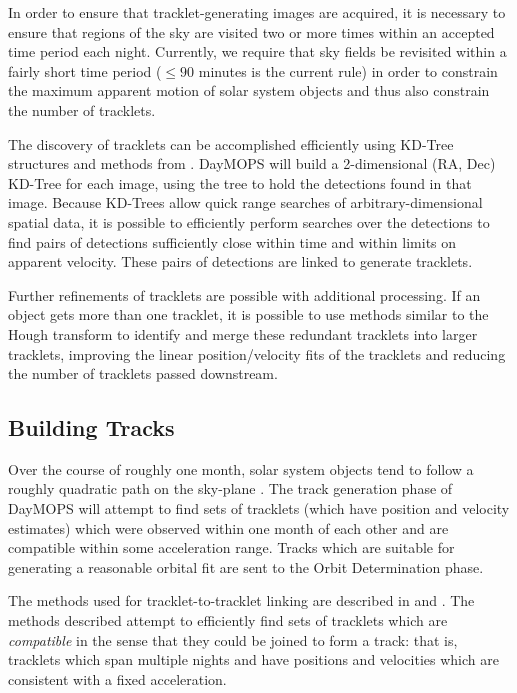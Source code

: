 \documentclass[12pt,preprint]{aastex}
\begin{document}
In order to ensure that tracklet-generating images are acquired, it is
necessary to ensure that regions of the sky are visited two or more
times within an accepted time period each night.  Currently, we
require that sky fields be revisited within a fairly short time period
($\leq 90$ minutes is the current rule) in order to constrain the
maximum apparent motion of solar system objects and thus also
constrain the number of tracklets.

The discovery of tracklets can be accomplished efficiently using
KD-Tree structures \citep{bentley_kdtrees} and methods from
\citet{kubica_thesis}.  DayMOPS will build a 2-dimensional (RA, Dec)
KD-Tree for each image, using the tree to hold the detections found in
that image.  Because KD-Trees allow quick range searches of
arbitrary-dimensional spatial data, it is possible to efficiently
perform searches over the detections to find pairs of detections
sufficiently close within time and within limits on apparent
velocity. These pairs of detections are linked to generate tracklets.


Further refinements of tracklets are possible with additional
processing. If an object gets more than one tracklet, it is possible
to use methods similar to the Hough transform to identify and merge
these redundant tracklets into larger tracklets, improving the linear
position/velocity fits of the tracklets and reducing the number of
tracklets passed downstream.

\subsection{Building Tracks}

Over the course of roughly one month, solar system objects tend to
follow a roughly quadratic path on the sky-plane
\citep{kubica_thesis}.  The track generation phase of DayMOPS will
attempt to find sets of tracklets (which have position and velocity
estimates) which were observed within one month of each other and are
compatible within some acceleration range.  Tracks which are
suitable for generating a reasonable orbital fit are sent to the Orbit
Determination phase.

The methods used for tracklet-to-tracklet linking are described in
\citet{kubica_thesis} and \citet{Kubica:2005:MTA:1081870.1081889}.
The methods described attempt to efficiently find sets of tracklets
which are \textit{compatible} in the sense that they could be joined
to form a track: that is, tracklets which span multiple nights and
have positions and velocities which are consistent with a fixed
acceleration.  
\end{document}
